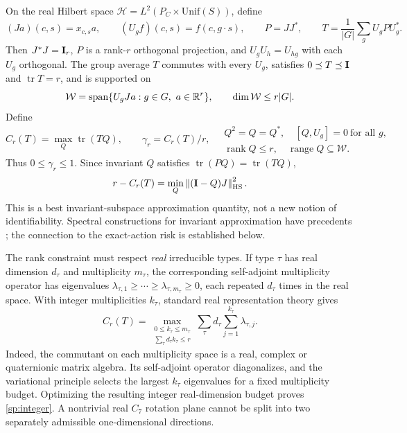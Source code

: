 On the real Hilbert space $\mathcal H=L^2(P_C\times\mathrm{Unif}(S))$, define
\[
 (Ja)(c,s)=x_{c,s}a,\qquad (U_gf)(c,s)=f(c,g\cdot s),\qquad
 P=JJ^*,\qquad T=\frac1{|G|}\sum_gU_gPU_g^*.
\]
Then $J^*J=\mathbf{I}_r$, $P$ is a rank-$r$ orthogonal projection, and $U_gU_h=U_{hg}$ with each $U_g$ orthogonal. The group average $T$ commutes with every $U_g$, satisfies $0\preceq T\preceq\mathbf{I}$ and $\operatorname{tr}T=r$, and is supported on
\[
 \mathcal W=\operatorname{span}\{U_gJa:g\in G,\ a\in\mathbb{R}^r\},\qquad \dim\mathcal W\le r|G|.
\]
Define
\begin{equation}
 C_r(T)=\max_{Q}\operatorname{tr}(TQ),\qquad \gamma_r=C_r(T)/r,
 \quad
 \begin{gathered}
 Q^2=Q=Q^*,\quad [Q,U_g]=0\ \text{for all }g,\\[-2pt]
 \operatorname{rank}Q\le r,\quad\operatorname{range}Q\subseteq\mathcal W.
 \end{gathered}
 \label{sp:budget}
\end{equation}
Thus $0\le\gamma_r\le1$. Since invariant $Q$ satisfies $\operatorname{tr}(PQ)=\operatorname{tr}(TQ)$,
\[
 r-C_r(T)=\min_Q\left\lVert (\mathbf{I}-Q)J\right\rVert_{\mathrm{HS}}^2.
\]
This is a best invariant-subspace approximation quantity, not a new notion of identifiability. Spectral constructions for invariant approximation have precedents \citep{barbieri2020approximation}; the connection to the exact-action risk is established below.

The rank constraint must respect \emph{real} irreducible types. If type $\tau$ has real dimension $d_\tau$ and multiplicity $m_\tau$, the corresponding self-adjoint multiplicity operator has eigenvalues $\lambda_{\tau,1}\ge\cdots\ge\lambda_{\tau,m_\tau}\ge0$, each repeated $d_\tau$ times in the real space. With integer multiplicities $k_\tau$, standard real representation theory \citep{serre1977linear} gives
\begin{equation}
 C_r(T)=\max_{\substack{0\le k_\tau\le m_\tau\\\sum_\tau d_\tau k_\tau\le r}}
 \sum_\tau d_\tau\sum_{j=1}^{k_\tau}\lambda_{\tau,j}.
 \label{sp:integer}
\end{equation}
Indeed, the commutant on each multiplicity space is a real, complex or quaternionic matrix algebra. Its self-adjoint operator diagonalizes, and the variational principle selects the largest $k_\tau$ eigenvalues for a fixed multiplicity budget. Optimizing the resulting integer real-dimension budget proves \cref{sp:integer}. A nontrivial real $C_7$ rotation plane cannot be split into two separately admissible one-dimensional directions.


